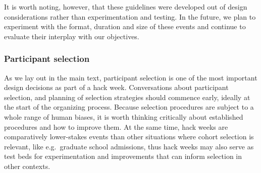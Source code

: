 It is worth noting, however, that these guidelines were developed out of design considerations rather than experimentation and testing. In the future, we plan to experiment with the format, duration and size of these events and continue to evaluate their interplay with our objectives.

\subsubsection{Participant selection}

As we lay out in the main text, participant selection is one of the most important design decisions as part of a hack week. Conversations about participant selection, and planning of selection strategies should commence early, ideally at the start of the organizing process.
Because selection procedures are subject to a whole range of human biases, it is worth thinking critically about established procedures and how to improve them. At the same time, hack weeks are comparatively lower-stakes events than other situations where cohort selection is relevant, like e.g.\ graduate school admissions, thus hack weeks may also serve as test beds for experimentation and improvements that can inform selection in other contexts.

